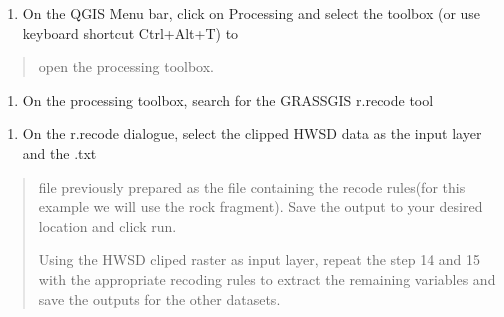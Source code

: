 \documentclass[letterpaper,10pt,english]{sphinxmanual}
\begin{document}
\begin{enumerate}
%
\setcounter{enumi}{12}
\item {} 
\sphinxAtStartPar
On the Q\sphinxhyphen{}GIS Menu bar, click on Processing and select the toolbox (or use keyboard shortcut Ctrl+Alt+T) to

\end{enumerate}
\begin{quote}

\sphinxAtStartPar
open the processing toolbox.

\end{quote}
\begin{enumerate}
%
\setcounter{enumi}{13}
\item {} 
\sphinxAtStartPar
On the processing toolbox, search for the GRASS\sphinxhyphen{}GIS r.recode tool

\end{enumerate}
\begin{quote}

\end{quote}
\begin{enumerate}
%
\setcounter{enumi}{14}
\item {} 
\sphinxAtStartPar
On the r.recode dialogue, select the clipped HWSD data as the input layer and the .txt

\end{enumerate}
\begin{quote}

\sphinxAtStartPar
file previously prepared as the file containing the recode rules(for this example we will use the rock fragment).
Save the output to your desired location and click run.


\sphinxAtStartPar
Using the HWSD cliped raster as input layer, repeat the step 14 and 15 with the appropriate recoding rules to extract
the remaining variables and save the outputs for the other datasets.

\end{quote}
\end{document}
